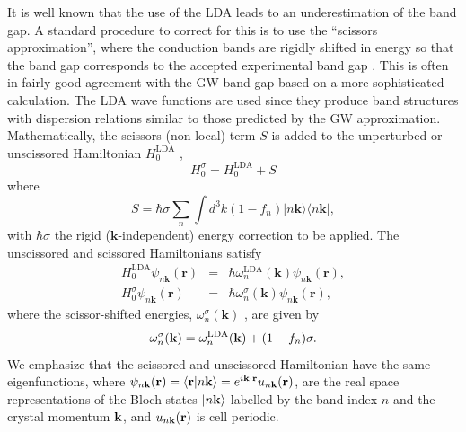 \documentclass[floatfix,prb,aps,superscriptaddress,11pt,preprint,letterpaper]{revtex4}
\begin{document}
{\color{red} It} is well known that the use of the {\color{red} LDA} 
leads to an underestimation of the band gap. A standard
procedure to correct for this is to
use {\color{red} the} ``scissors approximation'', {\color{red} where the 
conduction bands are rigidly shifted in energy} so that the band gap 
corresponds to the accepted experimental band gap{\color{red} .
This} is often in fairly good agreement with the GW
band gap based on a more sophisticated calculation.\cite{hybertsenPRB86}
{\color{red} T}he LDA wave functions are used since they produce band
structures with dispersion relations similar to those predicted by the GW
approximation. Mathematically, {\color{red} the scissors (non-local) term 
$S$ is added} to the unperturbed or unscissored Hamiltonian {\color{red} $H^{\mathrm{LDA}}_{0}$ ,}
\begin{equation*}
H^\sigma_{0}=H^{\mathrm{LDA}}_{0}+S
\end{equation*}
where 
\begin{equation}
S=\hbar \sigma\sum_{n}\int d^{3}k(1-f_{n})
|n\mathbf{k}\rangle\langle n\mathbf{k}|,
\label{hats}
\end{equation}
with $\hbar \sigma$  the rigid ($\mathbf{k}$-independent) energy correction to be
applied. 
The unscissored and scissored Hamiltonians satisfy 
\begin{eqnarray*}
H^{\mathrm{LDA}}_{0}\psi _{n\mathbf{k}}(\mathbf{r}) &=&\hbar \omega^{\mathrm{LDA}}_{n}(\mathbf{k})\psi _{n\mathbf{k}}(\mathbf{r}),
\label{hamils} \\
H_{0}^\sigma\psi _{n\mathbf{k}}(\mathbf{r}) &=&\hbar \omega_{n}^\sigma
(\mathbf{k})\psi _{n\mathbf{k}}(\mathbf{r}),
\end{eqnarray*}
where the scissor-shifted energies, 
$\omega_{n}^\sigma(\mathbf{k})$ , are given by
\begin{equation}
\omega_{n}^\sigma(\mathbf{k})=\omega^{\mathrm{LDA}}_{n}(\mathbf{k})+(1-f_{n})\sigma.
\label{wese}
\end{equation}
We emphasize that the {\color{red} scissored and unscissored Hamiltonian 
have the same eigenfunctions,} where
$\psi_{n\mathbf{k}}(\mathbf{r})=\langle {\mathbf{r}} | {n\mathbf{k}} \rangle=e^{i\mathbf{k}\cdot\mathbf{r}}u_{n\mathbf{k}}(\mathbf{r})$,
are the real space representations of the Bloch states $| n\mathbf{k} \rangle$ labelled 
by the band index $n$ and the crystal momentum $\mathbf{k}$, and $u_{n\mathbf{k}}(\mathbf{r})$
is cell periodic. 
\end{document}
